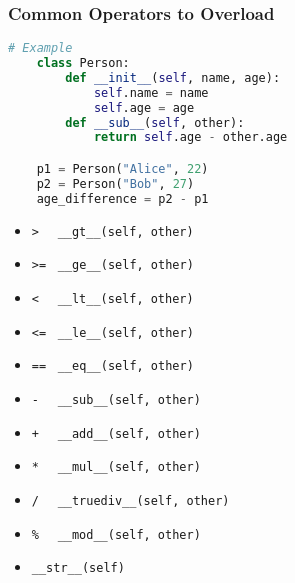 \documentclass{beamer}
\begin{document}
%
%
\begin{frame}[fragile]
    \frametitle{Common Operators to Overload}
    \begin{lstlisting}[language=Python, autogobble, basicstyle=\tiny]
    # Example
    class Person:
        def __init__(self, name, age):
            self.name = name
            self.age = age
        def __sub__(self, other):
            return self.age - other.age

    p1 = Person("Alice", 22)
    p2 = Person("Bob", 27)
    age_difference = p2 - p1
    \end{lstlisting}
    \vfill
    \begin{minipage}{0.49\textwidth}
    \begin{itemize}
        \item \lstinline|>| \ \textrightarrow \ \lstinline|__gt__(self, other)| 
        \item \lstinline|>=| \textrightarrow \ \lstinline|__ge__(self, other)|
        \item \lstinline|<| \ \textrightarrow \ \lstinline|__lt__(self, other)|
        \item \lstinline|<=| \textrightarrow \ \lstinline|__le__(self, other)|
        \item \lstinline|==| \textrightarrow \ \lstinline|__eq__(self, other)|
    \end{itemize}
    \end{minipage}
    \hfill
    \begin{minipage}{0.49\textwidth}
    \begin{itemize}
        \item \lstinline|-| \ \textrightarrow \ \lstinline|__sub__(self, other)|
        \item \lstinline|+| \ \textrightarrow \ \lstinline|__add__(self, other)|
        \item \lstinline|*| \ \textrightarrow \ \lstinline|__mul__(self, other)|
        \item \lstinline|/| \ \textrightarrow \ \lstinline|__truediv__(self, other)|
        \item \lstinline|%| \ \textrightarrow \ \lstinline|__mod__(self, other)|
        \item \lstinline|__str__(self)|
    \end{itemize}
    \end{minipage}
\end{frame}
\end{document}
